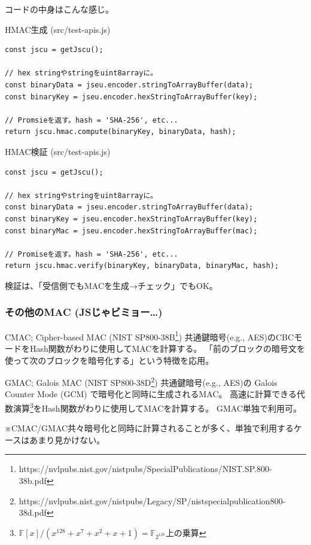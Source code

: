 \documentclass[12pt,dvipdfmx]{beamer}
\begin{document}
\begin{frame}[fragile]
コードの中身はこんな感じ。
\begin{block}{\small HMAC生成 (src/test-apis.js)}
\scriptsize
\begin{verbatim}
const jscu = getJscu();

// hex stringやstringをuint8arrayに。
const binaryData = jseu.encoder.stringToArrayBuffer(data);
const binaryKey = jseu.encoder.hexStringToArrayBuffer(key);

// Promsieを返す。hash = 'SHA-256', etc...
return jscu.hmac.compute(binaryKey, binaryData, hash);
\end{verbatim}
\end{block}

\begin{block}{\small HMAC検証 (src/test-apis.js)}
\scriptsize
\begin{verbatim}
const jscu = getJscu();

// hex stringやstringをuint8arrayに。
const binaryData = jseu.encoder.stringToArrayBuffer(data);
const binaryKey = jseu.encoder.hexStringToArrayBuffer(key);
const binaryMac = jseu.encoder.hexStringToArrayBuffer(mac);

// Promiseを返す。hash = 'SHA-256', etc...
return jscu.hmac.verify(binaryKey, binaryData, binaryMac, hash);
\end{verbatim}
\end{block}

検証は、「受信側でもMACを生成→チェック」でもOK。
\end{frame}

\begin{frame}
\frametitle{その他のMAC (JSじゃビミョー…)}
\begin{block}{\small CMAC; Cipher-based MAC (NIST SP800-38B\footnote[frame]{\scriptsize https://nvlpubs.nist.gov/nistpubs/SpecialPublications/NIST.SP.800-38b.pdf})}
\alert{共通鍵暗号(e.g., AES)のCBCモードをHash関数がわりに使用}してMACを計算する。
「前のブロックの暗号文を使って次のブロックを暗号化する」という特徴を応用。
\end{block}

\begin{block}{\small GMAC; Galois MAC (NIST SP800-38D\footnote[frame]{\scriptsize https://nvlpubs.nist.gov/nistpubs/Legacy/SP/nistspecialpublication800-38d.pdf})}
共通鍵暗号(e.g., AES)の Galois Counter Mode (GCM) で暗号化と同時に生成されるMAC。
\alert{高速に計算できる代数演算\footnote[frame]{\scriptsize $\mathbb{F}[x]/(x^{128}\!+\!x^7\!+\!x^2\!+\!x\!+\!1) = \mathbb{F}_{2^{128}}$上の乗算}をHash関数がわりに使用}してMACを計算する。
GMAC単独で利用可。
\end{block}

※CMAC/GMAC共々暗号化と同時に計算されることが多く、単独で利用するケースはあまり見かけない。
\end{frame}
\end{document}
